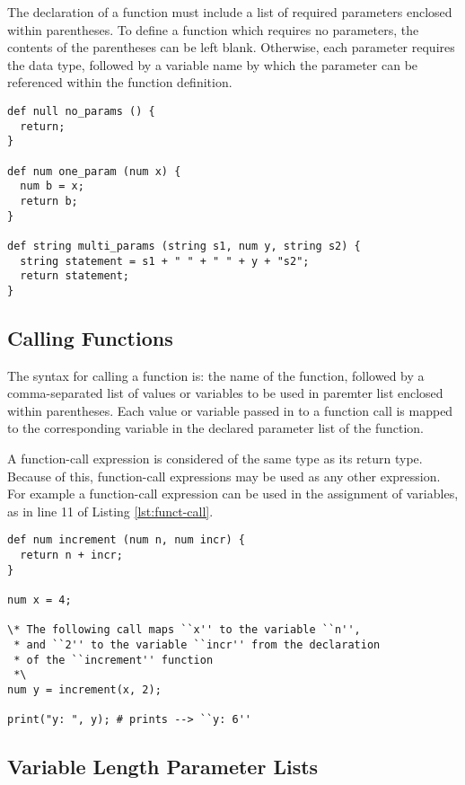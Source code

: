\documentclass{article}
\begin{document}
The declaration of a function must include a list of required parameters enclosed within parentheses. To define a function which requires no parameters, the contents of the parentheses can be left blank. Otherwise, each parameter requires the data type, followed by a variable name by which the parameter can be referenced within the function definition. 

\begin{lstlisting}[language=pltLang, caption=Parameters in function declarations., label=lst:funct-params]
def null no_params () {
  return;
}

def num one_param (num x) {
  num b = x;
  return b;
}

def string multi_params (string s1, num y, string s2) {
  string statement = s1 + " " + " " + y + "s2";
  return statement;
}

\end{lstlisting}

\subsection{Calling Functions}

The syntax for calling a function is: the name of the function, followed by a comma-separated list of values or variables to be used in paremter list enclosed within parentheses. Each value or variable passed in to a function call is mapped to the corresponding variable in the declared parameter list of the function.

A function-call expression is considered of the same type as its return type. Because of this, function-call expressions may be used as any other expression. For example a function-call expression can be used in the assignment of variables, as in line 11 of Listing \ref{lst:funct-call}.

\begin{lstlisting}[language=pltLang, caption=Function declaration and definition., label=lst:funct-call]
def num increment (num n, num incr) {
  return n + incr;
}

num x = 4;

\* The following call maps ``x'' to the variable ``n'',
 * and ``2'' to the variable ``incr'' from the declaration
 * of the ``increment'' function 
 *\
num y = increment(x, 2);

print("y: ", y); # prints --> ``y: 6''
\end{lstlisting}

\subsection{Variable Length Parameter Lists}
\end{document}
